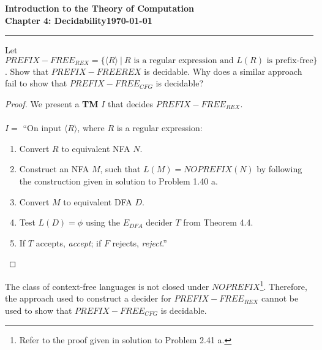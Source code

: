 \documentclass[11pt]{article}
\newcommand{\dated}{\today}
\begin{document}
\textbf{Introduction to the Theory of
Computation}\hfill\textbf{\myname}\\[0.01in]
\textbf{Chapter 4: Decidability}\hfill\textbf{\dated}\\
\smallskip\hrule\bigskip

\begin{problem}{4.22}
Let $PREFIX-FREE_{REX} = \{\langle R \rangle \ | \ R \text{ is a regular expression and } L(R) \text{ is prefix-free}\}$. Show that $PREFIX-FREE{REX}$ is decidable. Why does a similar approach fail to show that $PREFIX-FREE_{ CFG}$ is decidable?
\end{problem}

\begin{proof}
We present a \textbf{TM} $I$ that decides $PREFIX-FREE_{REX}$.  \\
\\
$I =$ \textquotedblleft On input $\langle R \rangle$, where $R$ is a regular expression:
\begin{enumerate}
\item Convert $R$ to equivalent NFA $N$.
\item Construct an NFA $M$, such that $L(M) = NOPREFIX(N)$ by following the construction given in solution to Problem 1.40 a.
\item Convert $M$ to equivalent DFA $D$.
\item Test $L(D) = \phi$ using the $E_{DFA}$ decider $T$ from Theorem 4.4.
\item If $T$ accepts, \textit{accept}; if $F$ rejects, \textit{reject}.\textquotedblright
\end{enumerate}
\end{proof}
The class of context-free languages is not closed under $NOPREFIX$\footnote{Refer to the proof given in solution to Problem 2.41 a.}. Therefore, the approach used to construct a decider for $PREFIX-FREE_{REX}$ cannot be used to show that $PREFIX-FREE_{ CFG}$ is decidable.
\end{document}
